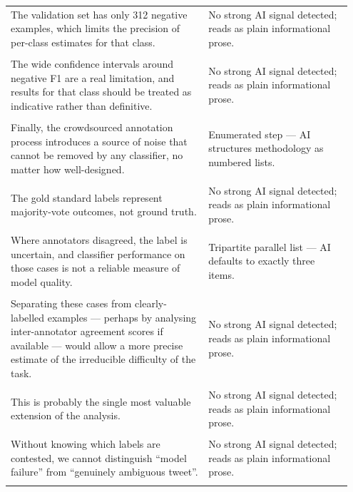 \documentclass[11pt]{article}
\begin{document}
\begin{longtable}{|p{0.55\linewidth}|p{0.40\linewidth}|}
\hline
\rule{0pt}{3.5cm} & \\
\hline
The validation set has only 312 negative examples, which limits the precision of per-class estimates for that class. & No strong AI signal detected; reads as plain informational prose. \\[2pt]
\hline
\rule{0pt}{3.5cm} & \\
\hline
The wide confidence intervals around negative F1 are a real limitation, and results for that class should be treated as indicative rather than definitive. & No strong AI signal detected; reads as plain informational prose. \\[2pt]
\hline
\rule{0pt}{3.5cm} & \\
\hline
Finally, the crowdsourced annotation process introduces a source of noise that cannot be removed by any classifier, no matter how well-designed. & Enumerated step --- AI structures methodology as numbered lists. \\[2pt]
\hline
\rule{0pt}{3.5cm} & \\
\hline
The gold standard labels represent majority-vote outcomes, not ground truth. & No strong AI signal detected; reads as plain informational prose. \\[2pt]
\hline
\rule{0pt}{3.5cm} & \\
\hline
Where annotators disagreed, the label is uncertain, and classifier performance on those cases is not a reliable measure of model quality. & Tripartite parallel list --- AI defaults to exactly three items. \\[2pt]
\hline
\rule{0pt}{3.5cm} & \\
\hline
Separating these cases from clearly-labelled examples --- perhaps by analysing inter-annotator agreement scores if available --- would allow a more precise estimate of the irreducible difficulty of the task. & No strong AI signal detected; reads as plain informational prose. \\[2pt]
\hline
\rule{0pt}{3.5cm} & \\
\hline
This is probably the single most valuable extension of the analysis. & No strong AI signal detected; reads as plain informational prose. \\[2pt]
\hline
\rule{0pt}{3.5cm} & \\
\hline
Without knowing which labels are contested, we cannot distinguish ``model failure'' from ``genuinely ambiguous tweet''. & No strong AI signal detected; reads as plain informational prose. \\[2pt]
\hline
\rule{0pt}{3.5cm} & \\

\end{longtable}
\end{document}

